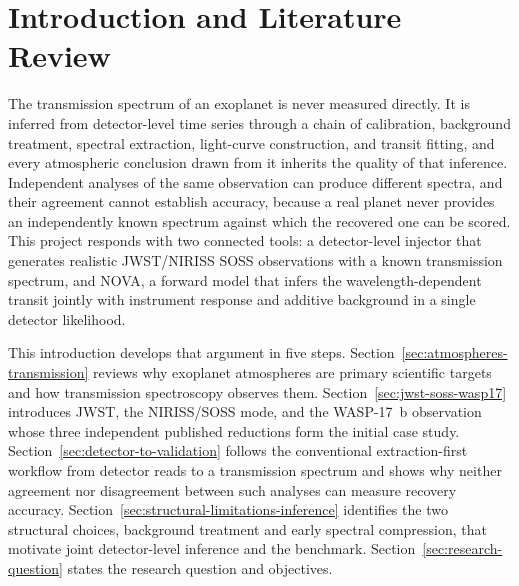 \section{Introduction and Literature Review}
\label{sec:introduction}

The transmission spectrum of an exoplanet is never measured directly. It is
inferred from detector-level time series through a chain of calibration,
background treatment, spectral extraction, light-curve construction, and
transit fitting, and every atmospheric conclusion drawn from it inherits the
quality of that inference. Independent analyses of the same observation can
produce different spectra, and their agreement cannot establish accuracy,
because a real planet never provides an independently known spectrum against
which the recovered one can be scored. This project responds with two
connected tools: a detector-level injector that generates realistic
JWST/NIRISS SOSS observations with a known transmission spectrum, and NOVA, a
forward model that infers the wavelength-dependent transit jointly with
instrument response and additive background in a single detector likelihood.

This introduction develops that argument in five steps.
Section~\ref{sec:atmospheres-transmission} reviews why exoplanet atmospheres
are primary scientific targets and how transmission spectroscopy observes
them. Section~\ref{sec:jwst-soss-wasp17} introduces JWST, the NIRISS/SOSS
mode, and the WASP-17~b observation whose three independent published
reductions form the initial case study.
Section~\ref{sec:detector-to-validation} follows the conventional
extraction-first workflow from detector reads to a transmission spectrum and
shows why neither agreement nor disagreement between such analyses can measure
recovery accuracy. Section~\ref{sec:structural-limitations-inference}
identifies the two structural choices, background treatment and early spectral
compression, that motivate joint detector-level inference and the benchmark.
Section~\ref{sec:research-question} states the research question and
objectives.

